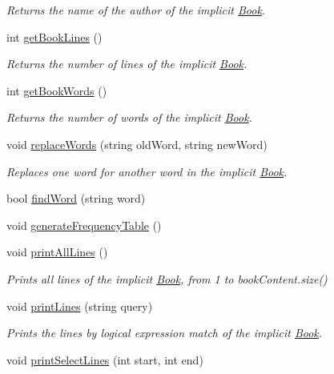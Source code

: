 \begin{DoxyCompactItemize}
\begin{DoxyCompactList}\small\item\em Returns the name of the author of the implicit \hyperlink{class_book}{Book}. \end{DoxyCompactList}\item 
int \hyperlink{class_book_a8f241d57fb5525e3008b3f3d6ba81291}{get\+Book\+Lines} ()
\begin{DoxyCompactList}\small\item\em Returns the number of lines of the implicit \hyperlink{class_book}{Book}. \end{DoxyCompactList}\item 
int \hyperlink{class_book_a6f0ccce41fd8db486578e0d325605813}{get\+Book\+Words} ()
\begin{DoxyCompactList}\small\item\em Returns the number of words of the implicit \hyperlink{class_book}{Book}. \end{DoxyCompactList}\item 
void \hyperlink{class_book_aaf182e24b86624b6ff54fba2581094a4}{replace\+Words} (string old\+Word, string new\+Word)
\begin{DoxyCompactList}\small\item\em Replaces one word for another word in the implicit \hyperlink{class_book}{Book}. \end{DoxyCompactList}\item 
bool \hyperlink{class_book_af3ceb5ae5d66adf4d594cac8d29294fc}{find\+Word} (string word)
\item 
void \hyperlink{class_book_a8d232eaeb4207707d77bc18e6dd467cd}{generate\+Frequency\+Table} ()
\item 
void \hyperlink{class_book_a07076ae8fe5e924f18bf7527e0ba5092}{print\+All\+Lines} ()
\begin{DoxyCompactList}\small\item\em Prints all lines of the implicit \hyperlink{class_book}{Book}, from 1 to book\+Content.\+size() \end{DoxyCompactList}\item 
void \hyperlink{class_book_a0c019a8318999229bf506f7f64e67a85}{print\+Lines} (string query)
\begin{DoxyCompactList}\small\item\em Prints the lines by logical expression match of the implicit \hyperlink{class_book}{Book}. \end{DoxyCompactList}\item 
void \hyperlink{class_book_a7193030998d6251851be26196762f8e6}{print\+Select\+Lines} (int start, int end)

\end{DoxyCompactItemize}
